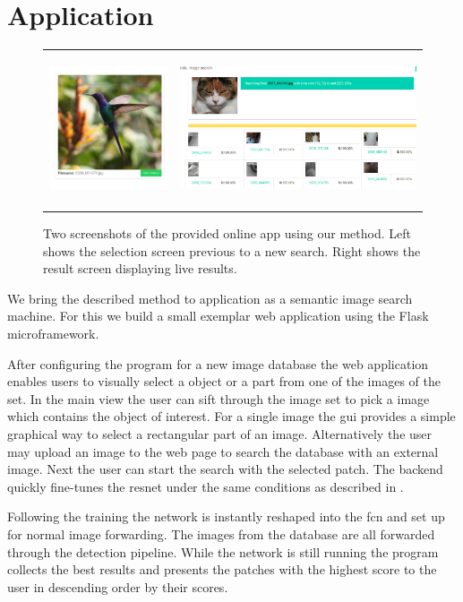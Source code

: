 %
\chapter{Application}
\label{sec:application}
\begin{figure}[h!]
    \begin{tabulary}{\textwidth}{cc}
        \includegraphics[height=4.5cm]{figures/server_select} &
        \includegraphics[height=4.5cm]{figures/server_results}
    \end{tabulary}
    \caption{Two screenshots of the provided online app using our method. Left shows the selection screen previous to a new search. Right shows the result screen displaying live results.}
    \label{fig:application}
\end{figure}
We bring the described method to application as a semantic image search machine. For this we build a small exemplar web application using the Flask microframework.

After configuring the program for a new image database the web application enables users to visually select a object or a part from one of the images of the set. In the main view the user can sift through the image set to pick a image which contains the object of interest. For a single image the \gls{gui} provides a simple graphical way to select a rectangular part of an image. Alternatively the user may upload an image to the web page to search the database with an external image.  Next the user can start the search with the selected patch. The backend quickly fine-tunes the \gls{resnet} under the same conditions as described in .

Following the training the network is instantly reshaped into the \gls{fcn} and set up for normal image forwarding. The images from the database are all forwarded through the detection pipeline. While the network is still running the program collects the best results and presents the patches with the highest score to the user in descending order by their scores.

